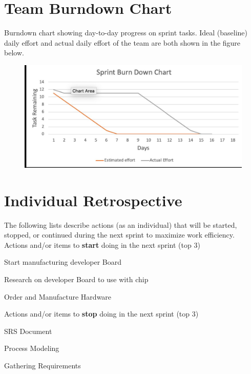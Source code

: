 \documentclass{article}
\begin{document}
\section{Team Burndown Chart}
Burndown chart showing day-to-day progress on sprint tasks. Ideal (baseline) daily effort and actual daily effort of the team are both shown in the figure below.
\begin{figure}[h]
\begin{center}
\includegraphics[width=1.0\textwidth]{Sprint2Burndown} %
\end{center}
\end{figure}

\pagebreak

\section{Individual Retrospective}
The following lists describe actions (as an individual) that will be started, stopped, or continued during the next sprint to maximize work efficiency. \\

Actions and/or items to \textbf{start} doing in the next sprint (top 3)
\begin{itemize}
\begin{item}
Start manufacturing developer Board
\end{item}
\begin{item}
Research on developer Board to use with chip
\end{item}
\begin{item}
Order and Manufacture Hardware 
\end{item}
\end{itemize}

Actions and/or items to \textbf{stop} doing in the next sprint (top 3)
\begin{itemize}
\begin{item}
SRS Document
\end{item}
\begin{item}
Process Modeling
\end{item}
\begin{item}
Gathering Requirements
\end{item}
\end{itemize}
\end{document}
